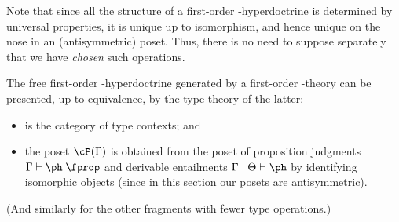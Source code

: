 Note that since all the structure of a first-order \fS-hyperdoctrine is determined by universal properties, it is unique up to isomorphism, and hence unique on the nose in an (antisymmetric) poset.
Thus, there is no need to suppose separately that we have \emph{chosen} such operations.

\begin{thm}\label{thm:fol-initial}
  The free first-order \fS-hyperdoctrine generated by a first-order \fS-theory can be presented, up to equivalence, by the type theory of the latter:
  \begin{itemize}
  \item \cS is the category of type contexts; and
  \item the poset $\cP(\Gamma)$ is obtained from the poset of proposition judgments $\Gamma\types \ph\prop$ and derivable entailments $\Gamma\cb\Theta\types\ph$ by identifying isomorphic objects (since in this section our posets are antisymmetric).
  \end{itemize}
  (And similarly for the other fragments with fewer type operations.)
\end{thm}
